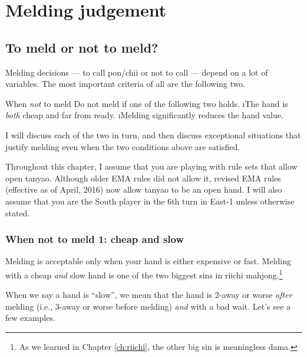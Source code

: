 
\chapter{Melding judgement} \label{ch:call}
\thispagestyle{empty}

\section{To meld or not to meld?}

Melding decisions --- to call {\jap pon}/{\jap chii} or not to call --- depend on a lot of variables. The most important criteria of all are the following two. 

\bigskip
\begin{itembox}[c]{When \emph{not} to meld}
Do not meld if one of the following two holds.
\be
\i The hand is \emph{both} cheap and far from ready.
\i Melding significantly reduces the hand value.
\ee
\end{itembox}

\bigskip
I will discuss each of the two in turn, and then discuss exceptional situations that justify melding even when the two conditions above are satisfied. 

\bigskip
Throughout this chapter, I assume that you are playing with rule sets that allow open {\jap tanyao}. Although older EMA rules did not allow it, revised EMA rules (effective as of April, 2016) now allow {\jap tanyao} to be an open hand. 
I will also assume that you are the South player in the 6th turn in East-1 unless otherwise stated. 

\subsection{When not to meld 1: cheap and slow}
Melding is acceptable only when your hand is either expensive or fast. 
Melding with a cheap \emph{and} slow hand is one of the two biggest sins in riichi mahjong.\footnote{As we learned in Chapter \ref{ch:riichi}, the other big sin is meaningless {\jap dama}.} 

\bigskip
When we say a hand is ``slow'', we mean that the hand is 2-away or worse \emph{after} melding (i.e., 3-away or worse before melding) \emph{and} with a bad wait. Let's see a few examples. 


